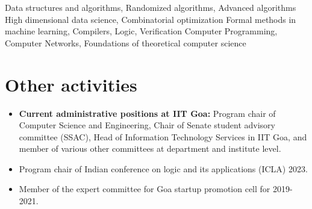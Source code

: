 \documentclass[11pt,a4paper,sans]{moderncv} %
\begin{document}
\else
{} {Data structures and algorithms, Randomized algorithms, Advanced algorithms}
 {High dimensional data science, Combinatorial optimization}
 {Formal methods in machine learning, Compilers, Logic, Verification}
 {Computer Programming, Computer Networks, Foundations of theoretical computer science}
\fi
\section{Other activities}
\begin{itemize}
 \item \textbf{Current administrative positions at IIT Goa:} Program chair of Computer Science and Engineering, Chair of Senate student advisory committee (SSAC), Head of Information Technology Services in IIT Goa, and member of various other committees at department and institute level.
 \iflong
 \item Program chair of Indian conference on logic and its applications (ICLA) 2023.
 \fi
 \item Member of the expert committee for Goa startup promotion cell for 2019-2021.
\end{itemize}


\end{document}

